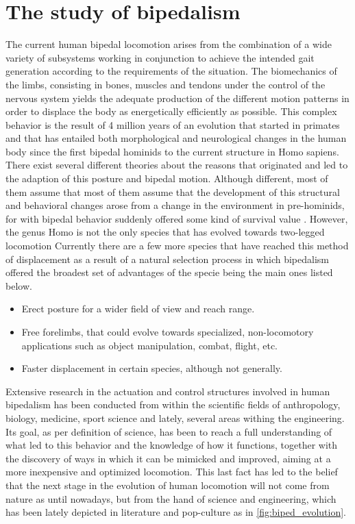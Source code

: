 \section{The study of bipedalism}
\label{sec:bipedalism}

The current human bipedal locomotion arises from the combination of a wide variety of subsystems working in conjunction to achieve the intended gait generation according to the requirements of the situation.
The biomechanics of the limbs, consisting in bones, muscles and tendons under the control of the nervous system yields the adequate production of the different motion patterns in order to displace the body as energetically efficiently as possible.
This complex behavior is the result of 4 million years of an evolution \cite{bipedalism2} that started in primates and that has entailed both morphological and neurological changes in the human body since the first bipedal hominids to the current structure in Homo sapiens.
There exist several different theories about the reasons that originated and led to the adaption of this posture and bipedal motion.
Although different, most of them assume that most of them assume that the development of this structural and behavioral changes arose from a change in the environment in pre-hominids, for with bipedal behavior suddenly offered some kind of survival value \cite{bipedalism1}.
However, the genus Homo is not the only species that has evolved towards two-legged locomotion
Currently there are a few more species that have reached this method of displacement as a result of a natural selection process in which bipedalism offered the broadest set of advantages of the specie being the main ones listed below. 

\begin{itemize}
	\item Erect posture for a wider field of view and reach range.
	\item Free forelimbs, that could evolve towards specialized, non-locomotory applications such as object manipulation, combat, flight, etc.
	\item Faster displacement in certain species, although not generally.
\end{itemize}

Extensive research in the actuation and control structures involved in human bipedalism has been conducted from within the scientific fields of anthropology, biology, medicine, sport science and lately, several areas withing the engineering.
Its goal, as per definition of science, has been to reach a full understanding of what led to this behavior and the knowledge of how it functions, together with the discovery of ways in which it can be mimicked and improved, aiming at a more inexpensive and optimized locomotion.
This last fact has led to the belief that the next stage in the evolution of human locomotion will not come from nature as until nowadays, but from the hand of science and engineering, which has been lately depicted in literature and pop-culture as in \ref{fig:biped_evolution}.

